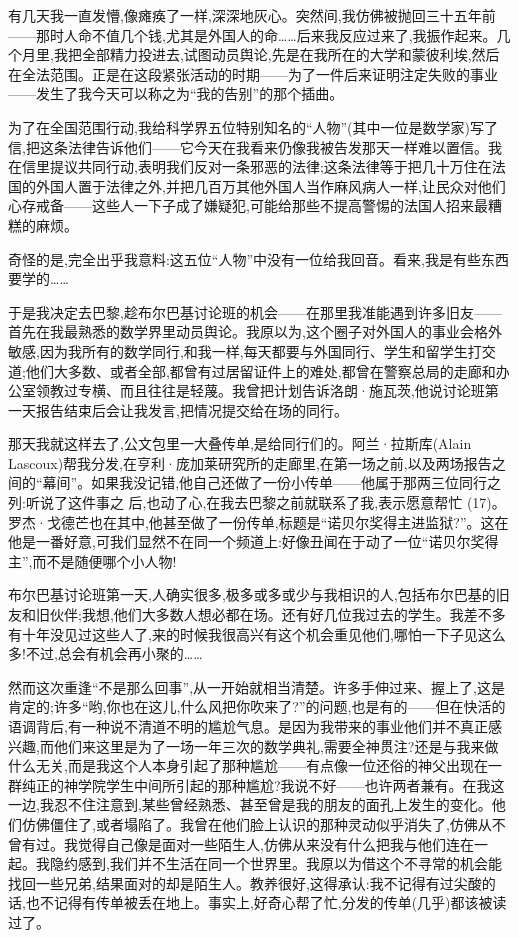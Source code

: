 有几天我一直发懵,像瘫痪了一样,深深地灰心。突然间,我仿佛被抛回三十五年前——那时人命不值几个钱,尤其是外国人的命……后来我反应过来了,我振作起来。几个月里,我把全部精力投进去,试图动员舆论,先是在我所在的大学和蒙彼利埃,然后在全法范围。正是在这段紧张活动的时期——为了一件后来证明注定失败的事业——发生了我今天可以称之为“我的告别”的那个插曲。

为了在全国范围行动,我给科学界五位特别知名的“人物”(其中一位是数学家)写了信,把这条法律告诉他们——它今天在我看来仍像我被告发那天一样难以置信。我在信里提议共同行动,表明我们反对一条邪恶的法律;这条法律等于把几十万住在法国的外国人置于法律之外,并把几百万其他外国人当作麻风病人一样,让民众对他们心存戒备——这些人一下子成了嫌疑犯,可能给那些不提高警惕的法国人招来最糟糕的麻烦。

奇怪的是,完全出乎我意料:这五位“人物”中没有一位给我回音。看来,我是有些东西要学的……

于是我决定去巴黎,趁布尔巴基讨论班的机会——在那里我准能遇到许多旧友——首先在我最熟悉的数学界里动员舆论。我原以为,这个圈子对外国人的事业会格外敏感,因为我所有的数学同行,和我一样,每天都要与外国同行、学生和留学生打交道;他们大多数、或者全部,都曾有过居留证件上的难处,都曾在警察总局的走廊和办公室领教过专横、而且往往是轻蔑。我曾把计划告诉洛朗·施瓦茨,他说讨论班第一天报告结束后会让我发言,把情况提交给在场的同行。

那天我就这样去了,公文包里一大叠传单,是给同行们的。阿兰·拉斯库(Alain Lascoux)帮我分发,在亨利·庞加莱研究所的走廊里,在第一场之前,以及两场报告之间的“幕间”。如果我没记错,他自己还做了一份小传单——他属于那两三位同行之列:听说了这件事之
后,也动了心,在我去巴黎之前就联系了我,表示愿意帮忙 (17)。罗杰·戈德芒也在其中,他甚至做了一份传单,标题是“诺贝尔奖得主进监狱?”。这在他是一番好意,可我们显然不在同一个频道上:好像丑闻在于动了一位“诺贝尔奖得主”,而不是随便哪个小人物!

布尔巴基讨论班第一天,人确实很多,极多或多或少与我相识的人,包括布尔巴基的旧友和旧伙伴;我想,他们大多数人想必都在场。还有好几位我过去的学生。我差不多有十年没见过这些人了,来的时候我很高兴有这个机会重见他们,哪怕一下子见这么多!不过,总会有机会再小聚的……

然而这次重逢“不是那么回事”,从一开始就相当清楚。许多手伸过来、握上了,这是肯定的;许多“哟,你也在这儿,什么风把你吹来了?”的问题,也是有的——但在快活的语调背后,有一种说不清道不明的尴尬气息。是因为我带来的事业他们并不真正感兴趣,而他们来这里是为了一场一年三次的数学典礼,需要全神贯注?还是与我来做什么无关,而是我这个人本身引起了那种尴尬——有点像一位还俗的神父出现在一群纯正的神学院学生中间所引起的那种尴尬?我说不好——也许两者兼有。在我这一边,我忍不住注意到,某些曾经熟悉、甚至曾是我的朋友的面孔上发生的变化。他们仿佛僵住了,或者塌陷了。我曾在他们脸上认识的那种灵动似乎消失了,仿佛从不曾有过。我觉得自己像是面对一些陌生人,仿佛从来没有什么把我与他们连在一起。我隐约感到,我们并不生活在同一个世界里。我原以为借这个不寻常的机会能找回一些兄弟,结果面对的却是陌生人。教养很好,这得承认:我不记得有过尖酸的话,也不记得有传单被丢在地上。事实上,好奇心帮了忙,分发的传单(几乎)都该被读过了。

